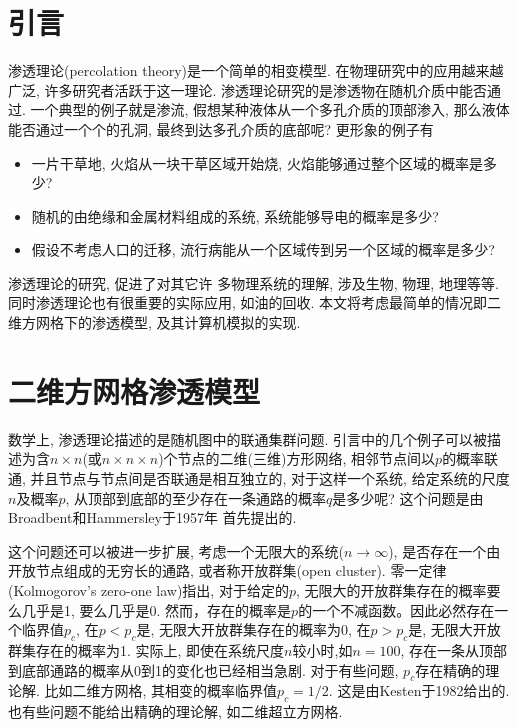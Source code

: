 \documentclass[11pt,a4paper,boxed]{caspset}
\begin{document}
\section{引言}
渗透理论(percolation theory)是一个简单的相变模型. 在物理研究中的应用越来越广泛, 许多研究者活跃于这一理论. 渗透理论研究的是渗透物在随机介质中能否通过. 一个典型的例子就是渗流, 假想某种液体从一个多孔介质的顶部渗入, 那么液体能否通过一个个的孔洞, 最终到达多孔介质的底部呢? 更形象的例子有
\begin{itemize}
\item 一片干草地, 火焰从一块干草区域开始烧, 火焰能够通过整个区域的概率是多少?
\item 随机的由绝缘和金属材料组成的系统, 系统能够导电的概率是多少?
\item 假设不考虑人口的迁移, 流行病能从一个区域传到另一个区域的概率是多少?
\end{itemize}

渗透理论的研究, 促进了对其它许
多物理系统的理解, 涉及生物, 物理, 地理等等. 同时渗透理论也有很重要的实际应用, 如油的回收. 本文将考虑最简单的情况即二维方网格下的渗透模型, 及其计算机模拟的实现.

\section{二维方网格渗透模型}
数学上, 渗透理论描述的是随机图中的联通集群问题. 引言中的几个例子可以被描述为含$n\times n$(或$n\times n\times n$)个节点的二维(三维)方形网络, 相邻节点间以$p$的概率联通, 并且节点与节点间是否联通是相互独立的, 对于这样一个系统, 给定系统的尺度$n$及概率$p$, 从顶部到底部的至少存在一条通路的概率$q$是多少呢? 这个问题是由Broadbent和Hammersley于1957年
首先提出的.

这个问题还可以被进一步扩展, 考虑一个无限大的系统($n\rightarrow\infty$), 是否存在一个由开放节点组成的无穷长的通路, 或者称开放群集(open cluster).
零一定律(Kolmogorov's zero-one law)指出, 对于给定的$p$, 无限大的开放群集存在的概率要么几乎是1, 要么几乎是0. 然而，存在的概率是$p$的一个不减函数。因此必然存在一个临界值$p_c$,
在$p<p_c$是, 无限大开放群集存在的概率为0,
在$p>p_c$是, 无限大开放群集存在的概率为1. 实际上, 即使在系统尺度$n$较小时,如$n=100$, 存在一条从顶部到底部通路的概率从0到1的变化也已经相当急剧. 对于有些问题, $p_c$存在精确的理论解. 比如二维方网格, 其相变的概率临界值$p_c=1/2$. 这是由Kesten于1982给出的. 也有些问题不能给出精确的理论解, 如二维超立方网格.
\end{document}
